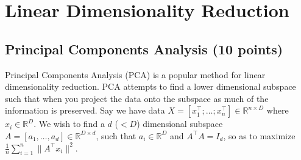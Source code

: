 \documentclass[a4paper]{article}
\theoremstyle{definition}
\newcommand{\RR}{\mathbb{R}}
\begin{document}
\pagebreak

\section{Linear Dimensionality Reduction}

\subsection{Principal Components Analysis  (10 points)}
\label{sec:pca}

Principal Components Analysis (PCA) is a popular method for linear dimensionality reduction. PCA attempts to find a lower dimensional subspace such that when you project the data onto the subspace as much of the information is preserved. Say we have data $X = [x_1^\top; \dots; x_n^\top] \in \RR^{n\times D}$ where  $x_i \in \RR^D$. We wish to find a $d$ ($ < D$) dimensional subspace $A = [a_1, \dots, a_d] \in \RR^{D\times d}$, such that $ a_i \in \RR^D$ and $A^\top A = I_d$, so as to maximize $\frac{1}{n} \sum_{i=1}^n \|A^\top x_i\|^2$.
\end{document}
